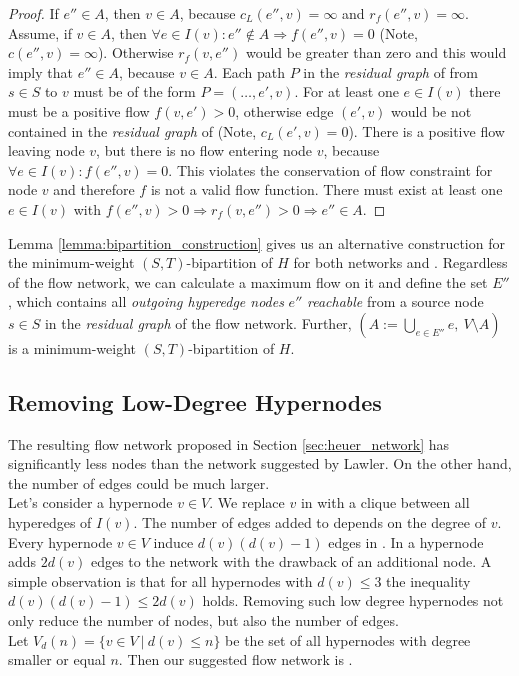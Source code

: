 \begin{proof}
If $e'' \in A$, then $v \in A$, because $c_L(e'',v) = \infty$ and $r_f(e'',v) = \infty$.
Assume, if $v \in A$, then $\forall e \in I(v): e'' \notin A \Rightarrow f(e'',v) = 0$ (Note, $c(e'',v) = \infty$). 
Otherwise $r_f(v, e'')$ would be greater than zero and this would imply that $e'' \in A$,
because $v \in A$. Each path $P$ in the \emph{residual graph} of  from $s \in S$ to $v$ must be of the 
form $P = (\ldots,e',v)$. For at least one $e \in I(v)$ there must be a positive flow $f(v,e') > 0$,
otherwise edge $(e',v)$ would be not contained in the \emph{residual graph} of  (Note, $c_L(e',v) = 0$).
There is a positive flow leaving node $v$, but there is no flow entering node $v$, because
$\forall e \in I(v): f(e'',v) = 0$. This violates the conservation of flow
constraint for node $v$ and therefore $f$ is not a valid flow function. There must exist at least one $e \in I(v)$
with $f(e'',v) > 0 \Rightarrow r_f(v,e'') > 0 \Rightarrow e'' \in A$.
\end{proof}

Lemma \ref{lemma:bipartition_construction} gives us an alternative construction for the minimum-weight $(S,T)$-bipartition
of $H$ for both networks  and . Regardless of the flow network, we can 
calculate a maximum flow on it and define the set $E''$, which contains all \emph{outgoing hyperedge
nodes} $e''$ \emph{reachable} from a source node $s \in S$ in the \emph{residual graph} of the flow network. 
Further, $(A := \bigcup_{e \in E''} e,\ V\setminus A)$ is a 
minimum-weight $(S,T)$-bipartition of $H$.


\subsection{Removing Low-Degree Hypernodes}
\label{sec:degree_network}

The resulting flow network  proposed in Section \ref{sec:heuer_network} has significantly
less nodes than the network  suggested by Lawler. On the other hand, the number of
edges could be much larger. \\
Let's consider a hypernode $v \in V$. We replace $v$ in  with a clique between all
hyperedges of $I(v)$. The number of edges added to  depends on the degree of
$v$. Every hypernode $v \in V$ induce $d(v)(d(v) - 1)$ edges in . In  a hypernode adds $2d(v)$ edges to the network with the drawback
of an additional node. A simple observation is that for all hypernodes with $d(v) \le 3$ the inequality
$d(v)(d(v) - 1) \le 2d(v)$ holds. Removing such low degree hypernodes not only reduce
the number of nodes, but also the number of edges. \\
Let $V_{d}(n) = \{v \in V\ |\ d(v) \le n\}$ be the set of all hypernodes
with degree smaller or equal $n$. Then our suggested flow network is .

